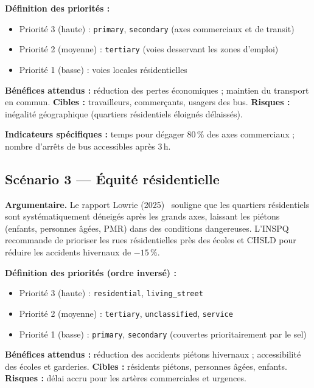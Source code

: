 \documentclass[11pt,a4paper]{article}
\begin{document}
\noindent\textbf{D\'efinition des priorit\'es :}
\begin{itemize}
  \item Priorit\'e 3 (haute) : \texttt{primary}, \texttt{secondary}
    (axes commerciaux et de transit)
  \item Priorit\'e 2 (moyenne) : \texttt{tertiary} (voies desservant les zones
    d'emploi)
  \item Priorit\'e 1 (basse) : voies locales r\'esidentielles
\end{itemize}

\noindent\textbf{B\'en\'efices attendus :}
r\'eduction des pertes \'economiques ; maintien du transport en commun.
\textbf{Cibles :} travailleurs, commer\c{c}ants, usagers des bus.
\textbf{Risques :} in\'egalit\'e g\'eographique (quartiers r\'esidentiels
\'eloign\'es d\'elaiss\'es).

\noindent\textbf{Indicateurs sp\'ecifiques :}
temps pour d\'egager 80\,\% des axes commerciaux ;
nombre d'arr\^ets de bus accessibles apr\`es 3\,h.

\subsection{Sc\'enario 3 --- \'Equit\'e r\'esidentielle}

\noindent\textbf{Argumentaire.}
Le rapport Lowrie (2025)~\cite{lowrie} souligne que les quartiers r\'esidentiels
sont syst\'ematiquement d\'eneig\'es apr\`es les grands axes, laissant les
pi\'etons (enfants, personnes \^ag\'ees, PMR) dans des conditions dangereuses.
L'INSPQ~\cite{inspeq} recommande de prioriser les rues r\'esidentielles pr\`es
des \'ecoles et CHSLD pour r\'eduire les accidents hivernaux de $-15\,\%$.

\noindent\textbf{D\'efinition des priorit\'es (ordre invers\'e) :}
\begin{itemize}
  \item Priorit\'e 3 (haute) : \texttt{residential}, \texttt{living\_street}
  \item Priorit\'e 2 (moyenne) : \texttt{tertiary}, \texttt{unclassified},
    \texttt{service}
  \item Priorit\'e 1 (basse) : \texttt{primary}, \texttt{secondary}
    (couvertes prioritairement par le sel)
\end{itemize}

\noindent\textbf{B\'en\'efices attendus :}
r\'eduction des accidents pi\'etons hivernaux ;
accessibilit\'e des \'ecoles et garderies.
\textbf{Cibles :} r\'esidents pi\'etons, personnes \^ag\'ees, enfants.
\textbf{Risques :} d\'elai accru pour les art\`eres commerciales et urgences.
\end{document}

